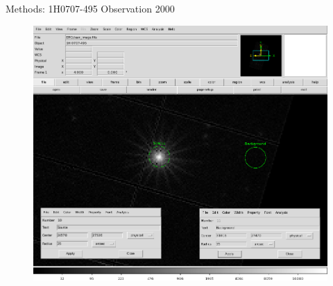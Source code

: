 \documentclass[]{beamer}
\begin{document}
\begin{frame}{Methods: 1H0707-495 Observation 2000}
\begin{figure}
\includegraphics[scale=0.30]{1H0707-495_0506200501_SrcBkg_Regions}
\end{figure}
\end{frame}
\end{document}
